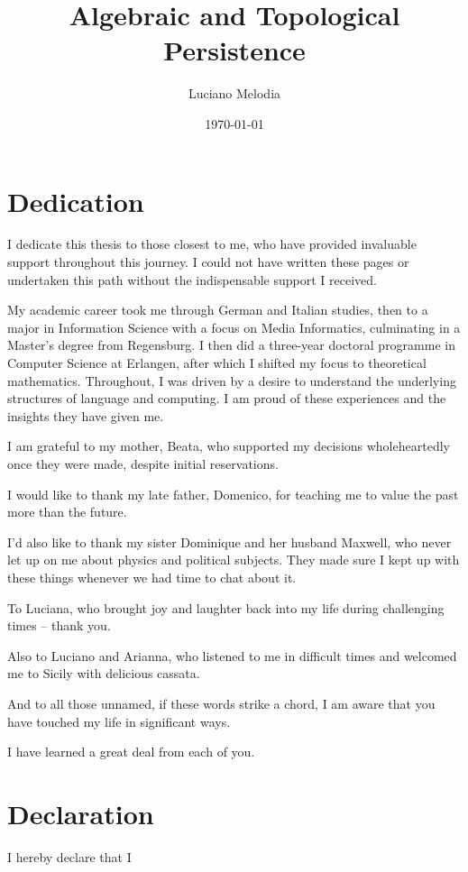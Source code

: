 \documentclass[12pt]{report}
\title{Algebraic and Topological Persistence}
\author{Luciano Melodia}
\date{\today}
\numberwithin{conj}{section}
\begin{document}
\vspace{0.5cm}



\chapter*{Dedication}
I dedicate this thesis to those closest to me, who have provided invaluable support throughout this journey. I could not have written these pages or undertaken this path without the indispensable support I received.

My academic career took me through German and Italian studies, then to a major in Information Science with a focus on Media Informatics, culminating in a Master's degree from Regensburg. I then did a three-year doctoral programme in Computer Science at Erlangen, after which I shifted my focus to theoretical mathematics. Throughout, I was driven by a desire to understand the underlying structures of language and computing. I am proud of these experiences and the insights they have given me.

I am grateful to my mother, Beata, who supported my decisions wholeheartedly once they were made, despite initial reservations.

I would like to thank my late father, Domenico, for teaching me to value the past more than the future.

I'd also like to thank my sister Dominique and her husband Maxwell, who never let up on me about physics and political subjects. They made sure I kept up with these things whenever we had time to chat about it.

To Luciana, who brought joy and laughter back into my life during challenging times -- thank you.

Also to Luciano and Arianna, who listened to me in difficult times and welcomed me to Sicily with delicious cassata.

And to all those unnamed, if these words strike a chord, I am aware that you have touched my life in significant ways.

I have learned a great deal from each of you.

\chapter*{Declaration}
I hereby declare that I
\end{document}
